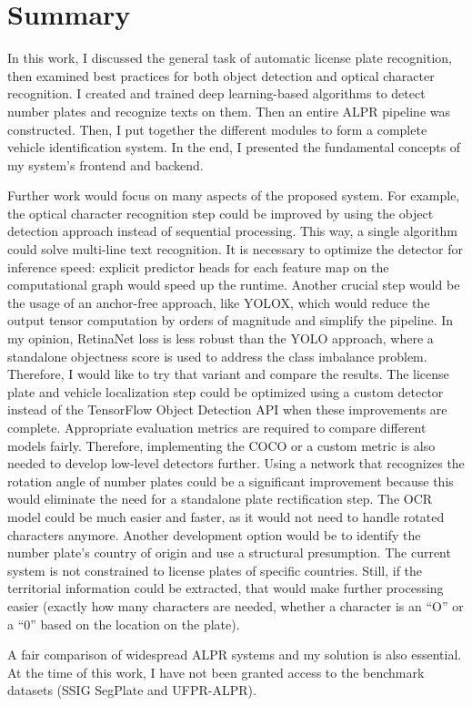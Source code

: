 \chapter{Summary}

In this work, I discussed the general task of automatic license plate recognition, then examined best practices for both object detection and optical character recognition. I created and trained deep learning-based algorithms to detect number plates and recognize texts on them. Then an entire ALPR pipeline was constructed. Then, I put together the different modules to form a complete vehicle identification system. In the end, I presented the fundamental concepts of my system's frontend and backend.

Further work would focus on many aspects of the proposed system. For example, the optical character recognition step could be improved by using the object detection approach instead of sequential processing. This way, a single algorithm could solve multi-line text recognition. It is necessary to optimize the detector for inference speed: explicit predictor heads for each feature map on the computational graph would speed up the runtime. Another crucial step would be the usage of an anchor-free approach, like YOLOX\cite{YOLOX}, which would reduce the output tensor computation by orders of magnitude and simplify the pipeline. In my opinion, RetinaNet\cite{RetinaNet} loss is less robust than the YOLO approach, where a standalone objectness score is used to address the class imbalance problem. Therefore, I would like to try that variant and compare the results. The license plate and vehicle localization step could be optimized using a custom detector instead of the TensorFlow Object Detection API when these improvements are complete. Appropriate evaluation metrics are required to compare different models fairly. Therefore, implementing the COCO or a custom metric is also needed to develop low-level detectors further. Using a network that recognizes the rotation angle of number plates could be a significant improvement because this would eliminate the need for a standalone plate rectification step. The OCR model could be much easier and faster, as it would not need to handle rotated characters anymore. Another development option would be to identify the number plate's country of origin and use a structural presumption. The current system is not constrained to license plates of specific countries. Still, if the territorial information could be extracted, that would make further processing easier (exactly how many characters are needed, whether a character is an ``O'' or a ``0'' based on the location on the plate).

A fair comparison of widespread ALPR systems and my solution is also essential. At the time of this work, I have not been granted access to the benchmark datasets (SSIG SegPlate and UFPR-ALPR).
